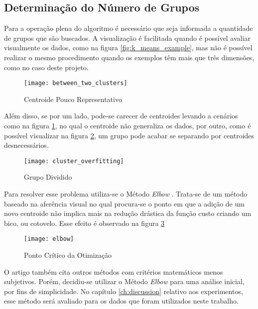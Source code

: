\subsection{Determinação do Número de Grupos}

Para a operação plena do algoritmo é necessário que seja informada a quantidade de grupos que são buscados. A visualização é facilitada quando é possível avaliar visualmente os dados, como na figura \ref{fig:k_means_example}, mas não é possível realizar o mesmo procedimento quando os exemplos têm mais que três dimensões, como no caso deste projeto.

\begin{figure}
\texttt{[image: between\_two\_clusters]}
\caption[Centroide Pouco Representativo]{Centroide Pouco Representativo} \label{fig:between_two_clusters}
\end{figure}

Além disso, se por um lado, pode-se carecer de centroides levando a cenários como na figura \ref{fig:between_two_clusters}, no qual o centroide não generaliza os dados, por outro, como é possível visualizar na figura \ref{fig:cluster_overfitting}, um grupo pode acabar se separando por centroides desnecessários.

\begin{figure}[htbp]
\centering
\texttt{[image: cluster\_overfitting]}
\caption[Grupo Dividido]{Grupo Dividido} \label{fig:cluster_overfitting}
\end{figure}

Para resolver esse problema utiliza-se o Método \textit{Elbow} \citep{kodinariya2013review}. Trata-se de um método baseado na aferência visual no qual procura-se o ponto em que a adição de um novo centroide não implica mais na redução drástica da função custo criando um bico, ou cotovelo. Esse efeito é observado na figura \ref{fig:elbow}

\begin{figure}[htbp]
\centering
\texttt{[image: elbow]}
\caption[Ponto Crítico da Otimização]{Ponto Crítico da Otimização} \label{fig:elbow}
\end{figure}

O artigo \citet{kodinariya2013review} também cita outros métodos com critérios matemáticos menos subjetivos. Porém, decidiu-se utilizar o Método \textit{Elbow} para uma análise inicial, por fins de simplicidade. No capítulo \ref{ch:discussion} relativo aos experimentos, esse método será avaliado para os dados que foram utilizados neste trabalho.

